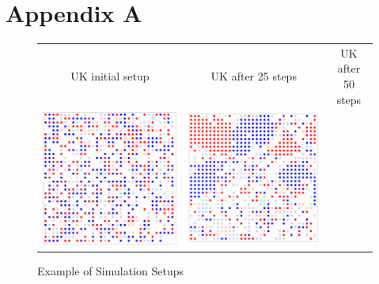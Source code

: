 \documentclass[12pt, a4paper]{article}
\begin{document}
	\section*{Appendix A}
	\begin{figure}[H]
		\caption{Example of Simulation Setups}
		\begin{tabular}{ccc}
			\centering
			UK initial setup & UK after 25 steps & UK after 50 steps \\
			\includegraphics[scale=0.35]{Plots/UK_step0.PNG} &  
			\includegraphics[scale=0.35]{Plots/UK_step25.PNG} &

\end{tabular}
\end{figure}
\end{document}

